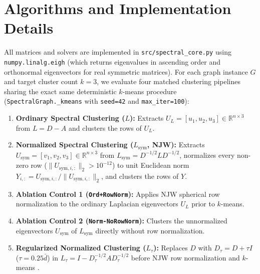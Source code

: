 \documentclass[10pt,twocolumn,a4paper]{article}
\begin{document}
\section{Algorithms and Implementation Details}
All matrices and solvers are implemented in \texttt{src/spectral\_core.py} using \texttt{numpy.linalg.eigh} (which returns eigenvalues in ascending order and orthonormal eigenvectors for real symmetric matrices). For each graph instance $G$ and target cluster count $k=3$, we evaluate four matched clustering pipelines sharing the exact same deterministic $k$-means procedure (\texttt{SpectralGraph.\_kmeans} with \texttt{seed=42} and \texttt{max\_iter=100}):
\begin{enumerate}\setlength{\itemsep}{1pt}\setlength{\parskip}{0pt}
    \item \textbf{Ordinary Spectral Clustering ($L$):} Extracts $U_L = [u_1, u_2, u_3] \in \mathbb{R}^{n \times 3}$ from $L = D - A$ and clusters the rows of $U_L$.
    \item \textbf{Normalized Spectral Clustering ($L_{\mathrm{sym}}$, NJW):} Extracts $U_{\mathrm{sym}} = [v_1, v_2, v_3] \in \mathbb{R}^{n \times 3}$ from $L_{\mathrm{sym}} = D^{-1/2} L D^{-1/2}$, normalizes every non-zero row ($\|U_{\mathrm{sym}, i,:}\|_2 > 10^{-12}$) to unit Euclidean norm $Y_{i,:} = U_{\mathrm{sym}, i,:} / \|U_{\mathrm{sym}, i,:}\|_2$, and clusters the rows of $Y$.
    \item \textbf{Ablation Control 1 (\texttt{Ord+RowNorm}):} Applies NJW spherical row normalization to the ordinary Laplacian eigenvectors $U_L$ prior to $k$-means.
    \item \textbf{Ablation Control 2 (\texttt{Norm-NoRowNorm}):} Clusters the unnormalized eigenvectors $U_{\mathrm{sym}}$ of $L_{\mathrm{sym}}$ directly without row normalization.
    \item \textbf{Regularized Normalized Clustering ($L_\tau$):} Replaces $D$ with $D_\tau = D + \tau I$ ($\tau = 0.25\bar{d}$) in $L_\tau = I - D_\tau^{-1/2} A D_\tau^{-1/2}$ before NJW row normalization and $k$-means \cite{qin2013regularized}.
\end{enumerate}
\end{document}
